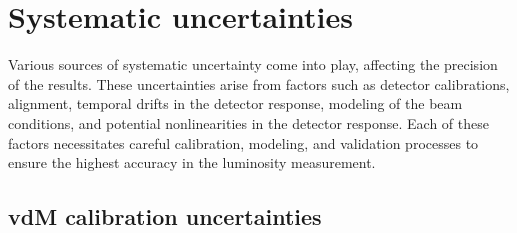 \section{Systematic uncertainties}

Various sources of systematic uncertainty come into play, affecting the precision of the results. These uncertainties arise from factors such as detector calibrations, alignment, temporal drifts in the detector response, modeling of the beam conditions, and potential nonlinearities in the detector response. Each of these factors necessitates careful calibration, modeling, and validation processes to ensure the highest accuracy in the luminosity measurement. %

\subsection{vdM calibration uncertainties}

